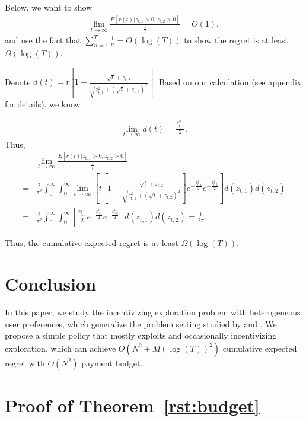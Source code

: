 \documentclass[twoside,11pt]{article}
\begin{document}
Below, we want to show 
\begin{align}
\lim_{t\rightarrow\infty}\frac{E[r(t)| z_{t,1}>0, z_{t,2}>0]}{\frac{1}{t}} = O(1), \nonumber
\end{align}
and use the fact that $\sum_{n=1}^{T}\frac{1}{n}=O(\log(T))$ to show the regret is at least $\Omega(\log(T))$.

Denote $d(t)=t\left[1-\frac{\sqrt{t}+z_{t,2}}{\sqrt{z_{t,1}^2+(\sqrt{t}+z_{t,2})^2}}\right]$. Based on our calculation (see appendix for details), we know

\begin{align}
\lim_{t\rightarrow \infty} d(t)=\frac{z_{t,1}^2}{2}. \label{ex:limit}
\end{align}
Thus,
\begin{align}
&\lim_{t\rightarrow \infty}\frac{E[r(t)| z_{t,1}>0, z_{t,2}>0]}{\frac{1}{t}} \nonumber \\
=& \frac{2}{\pi^2}\int_{0}^{\infty} \int_{0}^{\infty}\lim_{t\rightarrow \infty}\left[ t\left[1-\frac{\sqrt{t}+z_{t,2}}{\sqrt{z_{t,1}^2+(\sqrt{t}+z_{t,2})^2}}\right]e^{-\frac{z_{t,1}^2}{2}}e^{-\frac{z_{t,2}^2}{2}}\right]d(z_{t,1})d(z_{t,2}) \nonumber  \\
=&\frac{2}{\pi^2}\int_{0}^{\infty} \int_{0}^{\infty}\left[ \frac{z_{t,1}^2}{2}e^{-\frac{z_{t,1}^2}{2}}e^{-\frac{z_{t,2}^2}{2}}\right]d(z_{t,1})d(z_{t,2}) = \frac{1}{2\pi}. \nonumber
\end{align}


Thus, the cumulative expected regret is at least $\Omega(\log(T))$.




\section{Conclusion}
In this paper, we study the incentivizing exploration problem with heterogeneous user preferences, which generalize the problem setting studied by \cite{frazier2014incentivizing} and \cite{han2015incentivizing}. We propose a simple policy that mostly exploits and occasionally incentivizing exploration, which can achieve $O(N^2+M(\log(T))^2)$ cumulative expected regret with $O(N^2)$ payment budget.

\newpage

\appendix
\section*{Proof of Theorem~\ref{rst:budget}}
\end{document}
